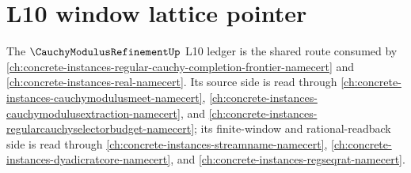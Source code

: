 \section{L10 window lattice pointer}
\label{sec:cauchymodulusrefinement-l10-window-lattice-pointer}

The $\CauchyModulusRefinementUp$ L10 ledger is the shared route consumed by \autoref{ch:concrete-instances-regular-cauchy-completion-frontier-namecert} and \autoref{ch:concrete-instances-real-namecert}. Its source side is read through \autoref{ch:concrete-instances-cauchymodulusmeet-namecert}, \autoref{ch:concrete-instances-cauchymodulusextraction-namecert}, and \autoref{ch:concrete-instances-regularcauchyselectorbudget-namecert}; its finite-window and rational-readback side is read through \autoref{ch:concrete-instances-streamname-namecert}, \autoref{ch:concrete-instances-dyadicratcore-namecert}, and \autoref{ch:concrete-instances-regseqrat-namecert}.

